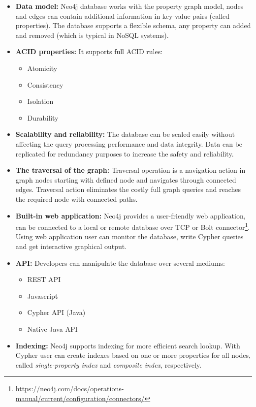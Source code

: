 \renewcommand{\labelitemi}{\textendash}
 \renewcommand\labelitemii{\textbullet}
\begin{itemize}
  \item \textbf{Data model:}
  Neo4j database works with the property graph model, nodes and edges can contain additional information in key-value pairs (called properties).
  The database supports a flexible schema, any property can added and removed (which is typical in NoSQL systems).
  \item \textbf{ACID properties:}
  It supports full ACID rules:
    \begin{itemize}
      \item Atomicity
      \item Consistency
      \item Isolation
      \item Durability
    \end{itemize}
  \item \textbf{Scalability and reliability:}
  The database can be scaled easily without affecting the query processing performance and data integrity.
  Data can be replicated for redundancy purposes to increase the safety and reliability.
  \item \textbf{The traversal of the graph:}
  Traversal operation is a navigation action in graph nodes starting with defined node and navigates through connected edges.
  Traversal action eliminates the costly full graph queries and reaches the required node with connected paths.
  \item \textbf{Built-in web application:}
  Neo4j provides a user-friendly web application, can be connected to a local or remote database over TCP or Bolt connector\footnote{\url{https://neo4j.com/docs/operations-manual/current/configuration/connectors/}}.  
  Using web application user can monitor the database, write Cypher queries and get interactive graphical output.
  \item \textbf{API:}
  Developers can manipulate the database over several mediums:
    \begin{itemize}
      \item REST API
      \item Javascript
      \item Cypher API (Java)
      \item Native Java API
    \end{itemize}
  \item \textbf{Indexing:}
  Neo4j supports indexing for more efficient search lookup.
  With Cypher user can create indexes based on one or more properties for all nodes, called \textit{single-property index} and \textit{composite index}, respectively.
\end{itemize}

